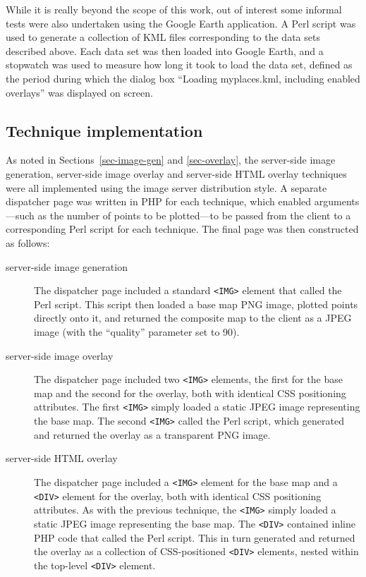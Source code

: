 \documentclass[acmtocl,acmnow]{acmtrans2m}
\begin{document}
While it is really beyond the scope of this work, out of interest some
informal tests were also undertaken using the Google Earth application.
A Perl script was used to generate a collection of KML files
corresponding to the data sets described above. Each data set was then
loaded into Google Earth, and a stopwatch was used to measure how long
it took to load the data set, defined as the period during which the
dialog box ``\textsf{Loading myplaces.kml, including enabled overlays}''
was displayed on screen.


\subsection{Technique implementation}

As noted in Sections~\ref{sec-image-gen} and \ref{sec-overlay}, the
server-side image generation, server-side image overlay and server-side
HTML overlay techniques were all implemented using the image server
distribution style. A separate dispatcher page was written in PHP for
each technique, which enabled arguments---such as the number of points
to be plotted---to be passed from the client to a corresponding Perl
script for each technique. The final page was then constructed as
follows:
\begin{description}

	\item[server-side image generation] The dispatcher page included a
	standard \verb|<IMG>| element that called the Perl script. This
	script then loaded a base map PNG image, plotted points directly
	onto it, and returned the
	composite map to the client as a JPEG image (with the ``quality''
	parameter set to 90).

	\item[server-side image overlay] The dispatcher page included two
	\verb|<IMG>| elements, the first for the base map and the second for
	the overlay, both with identical CSS positioning attributes. The
	first \verb|<IMG>| simply loaded a static JPEG image representing
	the base map. The second \verb|<IMG>| called the Perl script, which
	generated and returned the overlay as a transparent PNG image.

	\item[server-side HTML overlay] The dispatcher page included a
	\verb|<IMG>| element for the base map and a \verb|<DIV>| element for
	the overlay, both with identical CSS positioning attributes. As with
	the previous technique, the \verb|<IMG>| simply loaded a static JPEG
	image representing the base map. The \verb|<DIV>| contained inline
	PHP code that called the Perl script. This in turn generated and
	returned the overlay as a collection of CSS-positioned \verb|<DIV>|
	elements, nested within the top-level \verb|<DIV>| element.

\end{description}
\end{document}
